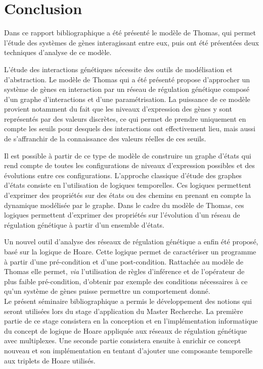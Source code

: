 \documentclass[fleqn,11pt]{report}
\begin{document}







\chapter*{Conclusion}
Dans ce rapport bibliographique a été présenté le modèle de Thomas, qui permet l'étude des systèmes de gènes interagissant entre eux, puis ont été présentées deux techniques d'analyse de ce modèle.

L'étude des interactions génétiques nécessite des outils de modélisation et d'abstraction. Le modèle de Thomas qui a été présenté propose d'approcher un système de gènes en interaction par un réseau de régulation génétique composé d'un graphe d'interactions et d'une paramétrisation. La puissance de ce modèle provient notamment du fait que les niveaux \mbox{d'expression} des gènes y sont représentés par des valeurs discrètes, ce qui permet de prendre uniquement en compte les seuils pour desquels des interactions ont effectivement lieu, mais aussi de s'affranchir de la connaissance des valeurs réelles de ces seuils.

Il est possible à partir de ce type de modèle de construire un graphe d'états qui rend compte de toutes les configurations de niveaux d'expression possibles et des évolutions entre ces configurations. L'approche classique d'étude des graphes d'états consiste en l'utilisation de logiques temporelles. Ces logiques permettent d'exprimer des propriétés sur des états ou des chemins en prenant en compte la dynamique modélisée par le graphe. Dans le cadre du modèle de Thomas, ces logiques permettent d'exprimer des propriétés sur l'évolution d'un réseau de régulation génétique à partir d'un ensemble d'états.

Un nouvel outil d'analyse des réseaux de régulation génétique a enfin été proposé, basé sur la logique de Hoare. Cette logique permet de caractériser un programme à partir d'une pré-condition et d'une post-condition. Rattachée au modèle de Thomas elle permet, \textit{via} l'utilisation de règles d'inférence et de l'opérateur de plus faible pré-condition, d'obtenir par exemple des conditions nécessaires à ce qu'un système de gènes puisse permettre un comportement donné.\\

Le présent séminaire bibliographique a permis le développement des notions qui seront utilisées lors du stage d'application du Master Recherche. La première partie de ce stage consistera en la conception et en l'implémentation informatique du concept de logique de Hoare appliquée aux réseaux de régulation génétique avec multiplexes. Une seconde partie consistera ensuite à enrichir ce concept nouveau et son implémentation en tentant d'ajouter une composante temporelle aux triplets de Hoare utilisés.


\newpage
{}


\end{document}
